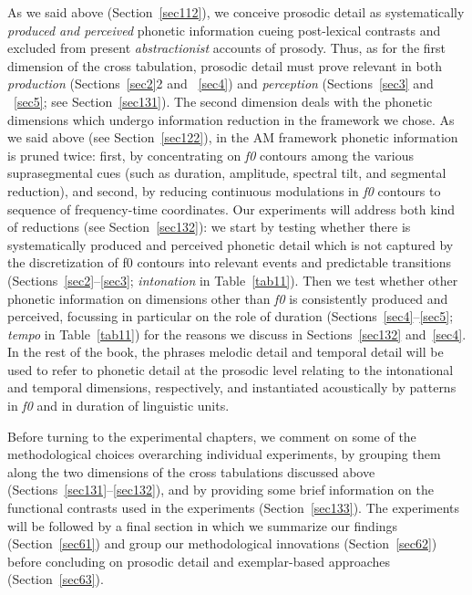 As we said above (Section~\ref{sec112}), we conceive prosodic detail as systematically \textit{produced and perceived} phonetic information cueing post-lexical contrasts and excluded from present \textit{abstractionist} accounts of prosody. Thus, as for the first dimension of the cross tabulation, prosodic detail must prove relevant in both \textit{production} (Sections~\ref{sec2}2 and ~\ref{sec4}) and \textit{perception} (Sections~\ref{sec3} and ~\ref{sec5}; see Section~\ref{sec131}). The second dimension deals with the phonetic dimensions which undergo information reduction in the framework we chose. As we said above (see Section~\ref{sec122}), in the AM framework phonetic information is pruned twice: first, by concentrating on \textit{f0} contours among the various suprasegmental cues (such as duration, amplitude, spectral tilt, and segmental reduction), and second, by reducing continuous modulations in \textit{f0} contours to sequence of frequency-time coordinates. Our experiments will address both kind of reductions (see Section~\ref{sec132}): we start by testing whether there is systematically produced and perceived phonetic detail which is not captured by the discretization of f0 contours into relevant events and predictable transitions (Sections~\ref{sec2}--\ref{sec3}; \textit{intonation} in Table~\ref{tab11}). Then we test whether other phonetic information on dimensions other than \textit{f0} is consistently produced and perceived, focussing in particular on the role of duration (Sections~\ref{sec4}--\ref{sec5}; \textit{tempo} in Table~\ref{tab11}) for the reasons we discuss in Sections~\ref{sec132} and~\ref{sec4}. In the rest of the book, the phrases melodic detail and temporal detail will be used to refer to phonetic detail at the prosodic level relating to the intonational and temporal dimensions, respectively, and instantiated acoustically by patterns in \textit{f0} and in duration of linguistic units.

Before turning to the experimental chapters, we comment on some of the methodological choices overarching individual experiments, by grouping them along the two dimensions of the cross tabulations discussed above (Sections~\ref{sec131}--\ref{sec132}), and by providing some brief information on the functional contrasts used in the experiments (Section~\ref{sec133}). The experiments will be followed by a final section in which we summarize our findings (Section~\ref{sec61}) and group our methodological innovations (Section~\ref{sec62}) before concluding on prosodic detail and exemplar-based approaches (Section~\ref{sec63}).

